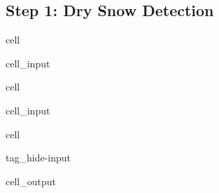 \documentclass[letterpaper,10pt,english]{jupyterBook}
\begin{document}
\subsection{Step 1: Dry Snow Detection}
\label{\detokenize{algorithm/CIMR_L2_TSA_PICASSO:step-1-dry-snow-detection}}
\begin{sphinxuseclass}{cell}\begin{sphinxVerbatimInput}

\begin{sphinxuseclass}{cell_input}
\begin{sphinxVerbatim}[commandchars=\\\{\}]
    
\end{sphinxVerbatim}

\end{sphinxuseclass}\end{sphinxVerbatimInput}

\end{sphinxuseclass}
\begin{sphinxuseclass}{cell}\begin{sphinxVerbatimInput}

\begin{sphinxuseclass}{cell_input}
\begin{sphinxVerbatim}[commandchars=\\\{\}]
  
  
\end{sphinxVerbatim}

\end{sphinxuseclass}\end{sphinxVerbatimInput}

\end{sphinxuseclass}
\begin{sphinxuseclass}{cell}
\begin{sphinxuseclass}{tag_hide-input}\begin{sphinxVerbatimOutput}

\begin{sphinxuseclass}{cell_output}
\noindent{}

\end{sphinxuseclass}\end{sphinxVerbatimOutput}

\end{sphinxuseclass}
\end{sphinxuseclass}
\end{document}
